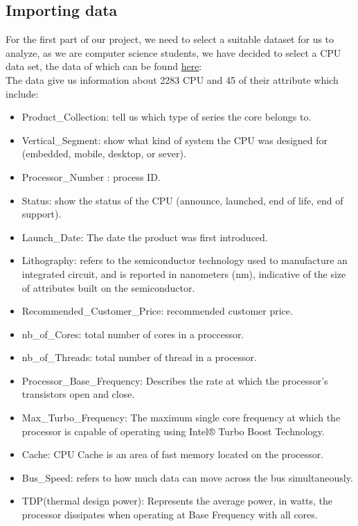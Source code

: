 \subsection{Importing data}
For the first part of our project, we need to select a suitable dataset for us to analyze, as we are computer science students, we have decided to select a CPU data set, the data of which can be found \href{https://www.kaggle.com/datasets/iliassekkaf/computerparts?select=Intel_CPUs.csv}{here}:
\\
The data give us information about 2283 CPU and 45 of their attribute which include:
\\
\begin{itemize}
    \item Product\_Collection: tell us which type of series the core belongs to.
    \item Vertical\_Segment: show what kind of system the CPU was designed for (embedded, mobile, desktop, or sever).
    \item Processor\_Number	: process ID.
    \item Status: show the status of the CPU (announce, launched, end of life, end of support).
    \item Launch\_Date: The date the product was first introduced. 
    \item Lithography: refers to the semiconductor technology used to manufacture an integrated circuit, and is reported in nanometers (nm), indicative of the size of attributes built on the semiconductor. 
    \item Recommended\_Customer\_Price: recommended customer price. 
    \item nb\_of\_Cores: total number of cores in a proccessor. 
    \item nb\_of\_Threads: total number of thread in a processor. 
    \item Processor\_Base\_Frequency: Describes the rate at which the processor's transistors open and close.
    \item Max\_Turbo\_Frequency: The maximum single core frequency at which the processor is capable of operating using Intel® Turbo Boost Technology. 
    \item Cache: CPU Cache is an area of fast memory located on the processor. 
    \item Bus\_Speed: refers to how much data can move across the bus simultaneously.
    \item TDP(thermal design power): Represents the average power, in watts, the processor dissipates when operating at Base Frequency with all cores. 

\end{itemize}
